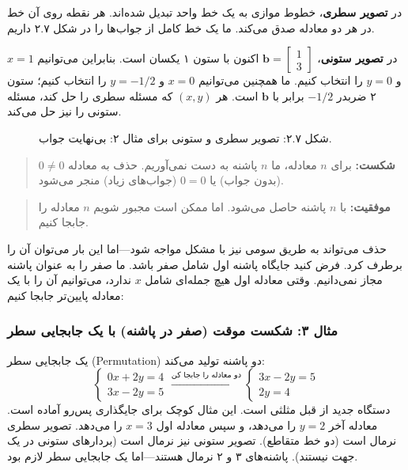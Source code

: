 \documentclass[12pt, a4paper]{book}
\theoremstyle{translator}
\begin{document}
	در \textbf{تصویر سطری}، خطوط موازی به یک خط واحد تبدیل شده‌اند. هر نقطه روی آن خط در هر دو معادله صدق می‌کند. ما یک خط کامل از جواب‌ها را در شکل ۲.۷ داریم.
	
	در \textbf{تصویر ستونی}، $\mathbf{b} = \begin{bmatrix} 1 \\ 3 \end{bmatrix}$ اکنون با ستون ۱ یکسان است. بنابراین می‌توانیم $x=1$ و $y=0$ را انتخاب کنیم. ما همچنین می‌توانیم $x=0$ و $y=-1/2$ را انتخاب کنیم؛ ستون ۲ ضربدر $-1/2$ برابر با $\mathbf{b}$ است. هر $(x,y)$ که مسئله سطری را حل کند، مسئله ستونی را نیز حل می‌کند.
	
	\begin{figure}[h!]
		\centering
		\caption{شکل ۲.۷: تصویر سطری و ستونی برای مثال ۲: بی‌نهایت جواب.}
	\end{figure}
	
	\begin{quote}
		\textbf{شکست:} برای $n$ معادله، ما $n$ پاشنه به دست نمی‌آوریم. حذف به معادله $0 \neq 0$ (بدون جواب) یا $0=0$ (جواب‌های زیاد) منجر می‌شود.
	\end{quote}
	\begin{quote}
		\textbf{موفقیت:} با $n$ پاشنه حاصل می‌شود. اما ممکن است مجبور شویم $n$ معادله را جابجا کنیم.
	\end{quote}
	
	حذف می‌تواند به طریق سومی نیز با مشکل مواجه شود—اما این بار می‌توان آن را برطرف کرد. فرض کنید جایگاه پاشنه اول شامل صفر باشد. ما صفر را به عنوان پاشنه مجاز نمی‌دانیم. وقتی معادله اول هیچ جمله‌ای شامل $x$ ندارد، می‌توانیم آن را با یک معادله پایین‌تر جابجا کنیم:
	
	\subsubsection*{مثال ۳: شکست موقت (صفر در پاشنه) با یک جابجایی سطر}
	یک جابجایی سطر (Permutation) دو پاشنه تولید می‌کند:
	\[
	\begin{cases}
		0x + 2y = 4 \\
		3x - 2y = 5
	\end{cases}
	\xrightarrow{\text{دو معادله را جابجا کن}}
	\begin{cases}
		3x - 2y = 5 \\
		2y = 4
	\end{cases}
	\]
	دستگاه جدید از قبل مثلثی است. این مثال کوچک برای جایگذاری پس‌رو آماده است. معادله آخر $y=2$ را می‌دهد، و سپس معادله اول $x=3$ را می‌دهد. تصویر سطری نرمال است (دو خط متقاطع). تصویر ستونی نیز نرمال است (بردارهای ستونی در یک جهت نیستند). پاشنه‌های ۳ و ۲ نرمال هستند—اما یک جابجایی سطر لازم بود.
	
\end{document}
